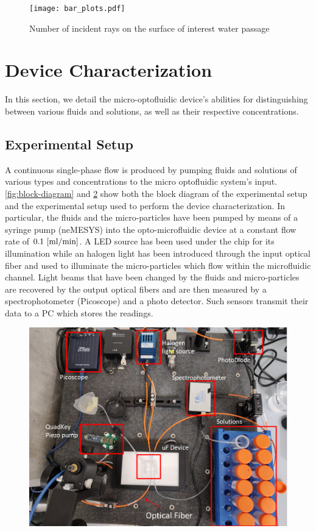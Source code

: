 \documentclass[sn-mathphys]{sn-jnl}
\theoremstyle{thmstyleone}%
\theoremstyle{thmstyletwo}%
\theoremstyle{thmstylethree}%
\begin{document}
\begin{figure}
	\texttt{[image: bar\_plots.pdf]}
	\caption{Number of incident rays on the surface of interest water passage}
	\label{fig:barplot-incidence}
\end{figure}


\section{Device Characterization}
In this section, we detail the micro-optofluidic device's abilities for distinguishing between various fluids and solutions, as well as their respective concentrations.

\subsection{Experimental Setup}

A continuous single-phase flow is produced by pumping fluids and solutions of various types and concentrations to the micro optofluidic system's input. \fig\ref{fig:block-diagram} and \fig \ref{fig:exp-setup} show both the block diagram of the experimental setup and the experimental setup used to perform the device characterization. In particular, the fluids and the micro-particles have been pumped by means of a syringe pump (neMESYS) into the opto-microfluidic device at a constant flow rate of $0.1~[\rm ml/min]$. A LED source has been used under the chip for its illumination while an halogen light has been introduced through the input optical fiber and used to illuminate the micro-particles which flow within the microfluidic channel. Light beams that have been changed by the fluids and micro-particles are recovered by the output optical fibers and are then measured by a spectrophotometer (Picoscope) and a photo detector. Such sensors transmit their data to a PC which stores the readings.


\begin{figure}
	\includegraphics[width=\columnwidth]{exp-setup.png}
	\caption{}
	\label{fig:exp-setup}
\end{figure}
\end{document}
